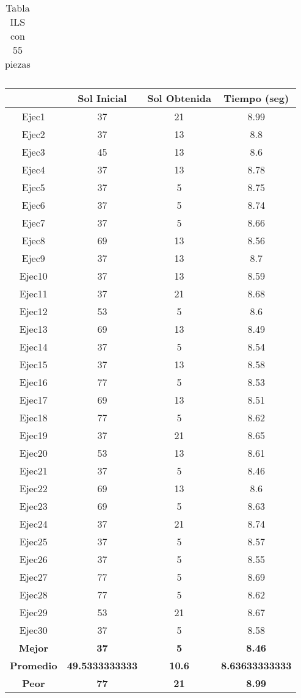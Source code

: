 \begin{center}
\begin{table}
\begin{tabular}{|c|c|c|c|}
\end{tabular}
\caption{Tabla ILS con 55 piezas}
\end{table}

\begin{table}

\begin{tabular}{|c|c|c|c|}



\hline
 & {\bf Sol Inicial} & {\bf Sol Obtenida} & {\bf Tiempo (seg)} \\
\hline
Ejec1 & 37 & 21  & 8.99 \\
\hline
Ejec2 & 37 & 13  & 8.8 \\
\hline
Ejec3 & 45 & 13  & 8.6 \\
\hline
Ejec4 & 37 & 13  & 8.78 \\
\hline
Ejec5 & 37 & 5  & 8.75 \\
\hline
Ejec6 & 37 & 5  & 8.74 \\
\hline
Ejec7 & 37 & 5  & 8.66 \\
\hline
Ejec8 & 69 & 13  & 8.56 \\
\hline
Ejec9 & 37 & 13  & 8.7 \\
\hline
Ejec10 & 37 & 13  & 8.59 \\
\hline
Ejec11 & 37 & 21  & 8.68 \\
\hline
Ejec12 & 53 & 5  & 8.6 \\
\hline
Ejec13 & 69 & 13  & 8.49 \\
\hline
Ejec14 & 37 & 5  & 8.54 \\
\hline
Ejec15 & 37 & 13  & 8.58 \\
\hline
Ejec16 & 77 & 5  & 8.53 \\
\hline
Ejec17 & 69 & 13  & 8.51 \\
\hline
Ejec18 & 77 & 5  & 8.62 \\
\hline
Ejec19 & 37 & 21  & 8.65 \\
\hline
Ejec20 & 53 & 13  & 8.61 \\
\hline
Ejec21 & 37 & 5  & 8.46 \\
\hline
Ejec22 & 69 & 13  & 8.6 \\
\hline
Ejec23 & 69 & 5  & 8.63 \\
\hline
Ejec24 & 37 & 21  & 8.74 \\
\hline
Ejec25 & 37 & 5  & 8.57 \\
\hline
Ejec26 & 37 & 5  & 8.55 \\
\hline
Ejec27 & 77 & 5  & 8.69 \\
\hline
Ejec28 & 77 & 5  & 8.62 \\
\hline
Ejec29 & 53 & 21  & 8.67 \\
\hline
Ejec30 & 37 & 5  & 8.58 \\
\hline
{\bf Mejor} & {\bf 37} & {\bf 5} & {\bf 8.46} \\
\hline
{\bf Promedio} & {\bf 49.5333333333} & {\bf 10.6} & {\bf 8.63633333333} \\
\hline
{\bf Peor} & {\bf 77} & {\bf 21} & {\bf 8.99} \\
\hline


\end{tabular}
\end{table}
\end{center}
